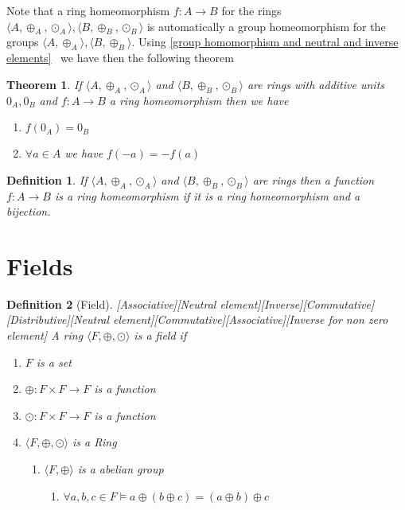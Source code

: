 \documentclass{book}
\newtheorem{definition}{Definition}
{\theorembodyfont{\rmfamily}\newtheorem{example}{Example}}
\newtheorem{theorem}{Theorem}
\begin{document}
{{Note that a ring homeomorphism $f : A \rightarrow B$ for the rings $\langle A,
\oplus_A, \odot_A \rangle, \langle B, \oplus_B, \odot_B \rangle$ is
automatically a group homeomorphism for the groups $\langle A, \oplus_A
\rangle, \langle B, \oplus_B \rangle$. Using \ref{group homomorphism and
neutral and inverse elements} \ we have then the following theorem

\begin{theorem}
  If $\langle A, \oplus_A, \odot_A \rangle$ and $\langle B, \oplus_B, \odot_B
  \rangle$ are rings with additive units $0_A, 0_B$ and $f : A \rightarrow B$
  a ring homeomorphism then we have
  \begin{enumerate}
    \item $f (0_A) = 0_B$
    
    \item $\forall a \in A$ we have $f (- a) = - f (a)$
  \end{enumerate}
\end{theorem}

\begin{definition}
  \label{ring isomorphism}{}If $\langle A, \oplus_A,
  \odot_A \rangle$ and $\langle B, \oplus_B, \odot_B \rangle$ are rings then a
  function $f : A \rightarrow B$ is a ring homeomorphism if it is a ring
  homeomorphism and a bijection.
\end{definition}

\section{Fields}

\begin{definition}[Field][Associative][Neutral
element][Inverse][Commutative][Distributive][Neutral
element][Commutative][Associative][Inverse for non zero element]
  \label{field}{}A ring $\langle F, \oplus, \odot \rangle$ is a
  field if \
  \begin{enumerate}
    \item $F$ is a set
    
    \item $\oplus : F \times F \rightarrow F$ is a function
    
    \item $\odot : F \times F \rightarrow F$ is a function
    
    \item $\langle F, \oplus, \odot \rangle$ is a Ring
    \begin{enumerate}
      \item $\langle F, \oplus \rangle$ is a abelian group
      \begin{enumerate}
        \item $\forall a, b, c \in F \vDash a \oplus (b \oplus c) = (a \oplus
        b) \oplus c$
        

\end{enumerate}
\end{enumerate}
\end{enumerate}
\end{definition}}}
\end{document}
